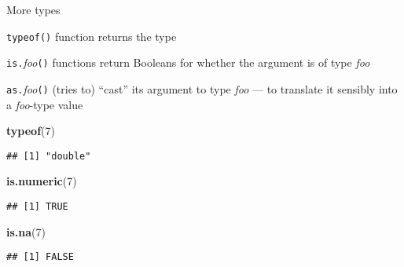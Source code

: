 \documentclass[8pt,ignorenonframetext,]{beamer}
\newenvironment{Shaded}{\begin{snugshade}}{\end{snugshade}}
\newcommand{\KeywordTok}[1]{\textcolor[rgb]{0.13,0.29,0.53}{\textbf{#1}}}
\newcommand{\DecValTok}[1]{\textcolor[rgb]{0.00,0.00,0.81}{#1}}
\newcommand{\NormalTok}[1]{#1}
\begin{document}
\begin{frame}[fragile]{More types}

\texttt{typeof()} function returns the type

\texttt{is.}\emph{foo}\texttt{()} functions return Booleans for whether
the argument is of type \emph{foo}

\texttt{as.}\emph{foo}\texttt{()} (tries to) ``cast'' its argument to
type \emph{foo} --- to translate it sensibly into a \emph{foo}-type
value

\end{frame}

\begin{frame}[fragile]{}

\begin{Shaded}
\begin{Highlighting}[]
\KeywordTok{typeof}\NormalTok{(}\DecValTok{7}\NormalTok{)}
\end{Highlighting}
\end{Shaded}

\begin{verbatim}
## [1] "double"
\end{verbatim}

\begin{Shaded}
\begin{Highlighting}[]
\KeywordTok{is.numeric}\NormalTok{(}\DecValTok{7}\NormalTok{)}
\end{Highlighting}
\end{Shaded}

\begin{verbatim}
## [1] TRUE
\end{verbatim}

\begin{Shaded}
\begin{Highlighting}[]
\KeywordTok{is.na}\NormalTok{(}\DecValTok{7}\NormalTok{)}
\end{Highlighting}
\end{Shaded}

\begin{verbatim}
## [1] FALSE
\end{verbatim}

\end{frame}
\end{document}
